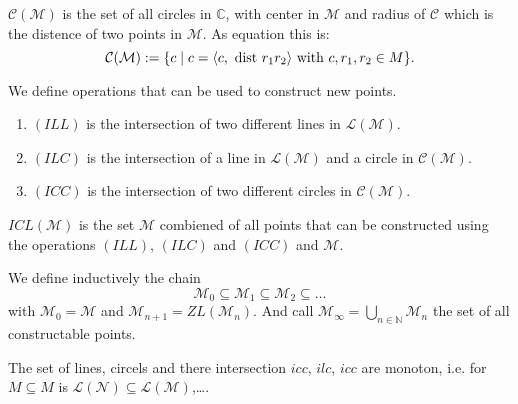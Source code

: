 \begin{definition}
    \label{def:set_of_circles}
    \leanok
    $\mathcal{C(M)}$ is the set of all circles in $\mathbb{C}$, with center in $\mathcal{M}$ and radius of $\mathcal{C}$ which is the distence of two points in $\mathcal{M}$. As equation this is:
    $$\mathcal{C(M)}:=\{c\mid c = \langle c, \text{ dist } r_1 r_2 \rangle \text{ with } c,r_1,r_2\in M\}.$$
\end{definition}

\begin{definition}
    \label{def:rules_to_constructed_a_point}
    \leanok
    We define operations that can be used to construct new points.
    \begin{enumerate}
        \item $(ILL)$ is the intersection of two different lines in $\mathcal{L(M)}$.
        \item $(ILC)$ is the intersection of a line in $\mathcal{L(M)}$ and a circle in $\mathcal{C(M)}$.
        \item $(ICC)$ is the intersection of two different circles in $\mathcal{C(M)}$.
    \end{enumerate}
    $ICL(\mathcal{M})$ is the set $\mathcal{M}$ combiened of all points that can be constructed using the operations $(ILL)$, $(ILC)$ and $(ICC)$ and $\mathcal{M}$.
\end{definition}

\begin{definition}
    \label{def:set_of_constructable_points}
    \leanok
    We define inductively the chain
    \begin{equation*}
        \mathcal{M}_0 \subseteq \mathcal{M}_1 \subseteq \mathcal{M}_2 \subseteq \dots
    \end{equation*}
    with $\mathcal{M}_0 = \mathcal{M}$ and $\mathcal{M}_{n+1} = ZL(\mathcal{M}_n)$.\newline
    And call $\mathcal{M}_{\infty} = \bigcup_{n \in \mathbb{N}} \mathcal{M}_n$ the set of all constructable points.
\end{definition}

\begin{remark}
    The set of lines, circels and there intersection $icc$, $ilc$, $icc$ are monoton, i.e. for $M\subseteq M$ is $\mathcal{L(N)}
    \subseteq\mathcal{L(M)}$,\dots .
\end{remark}

